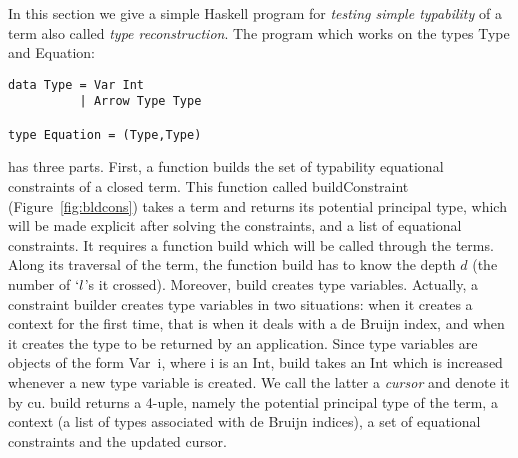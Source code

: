 \documentclass{jfp1}
\begin{document}
In this section we give a simple \textsf{Haskell} program for \emph{testing simple
typability} of a term also called \emph{type reconstruction}.  The program which
works on the types \textsf{Type} and \textsf{Equation}:
\begin{verbatim}
data Type = Var Int
          | Arrow Type Type

type Equation = (Type,Type)            
\end{verbatim}
has three parts. First, a function builds the set of typability equational
constraints of a closed term. This function called \textsf{buildConstraint}
(Figure~\ref{fig:bldcons}) takes a term and returns its potential principal type,
which will be made explicit after solving the constraints, and a list of equational
constraints.  It requires a function \textsf{build} which will be called through the
terms.  Along its traversal of the term, the function \textsf{build} has to know the
depth $d$ (the number of $`l$'s it crossed). Moreover, \textsf{build} creates type
variables.  Actually, a constraint builder creates type variables in two situations:
when it creates a context for the first time, that is when it deals with a de Bruijn
index, and when it creates the type to be returned by an application.  Since type
variables are objects of the form \textsf{Var~i}, where \textsf{i} is an
\textsf{Int}, \textsf{build} takes an \textsf{Int} which is increased whenever a new
type variable is created. We call the latter a \emph{cursor} and denote it by
\textsf{cu}. \textsf{build} returns a 4-uple, namely the potential principal type of
the term, a context (a list of types associated with de Bruijn indices), a set of
equational constraints and the updated cursor.
\end{document}
